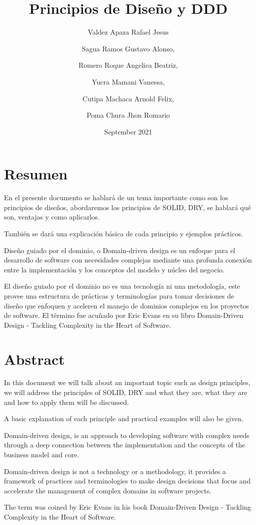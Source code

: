 \documentclass{article}
\title{Principios de Diseño y DDD}
\author{
Valdez Apaza Rafael Jesus 
\and 
Sagua Ramos Gustavo Alonso,
\and 
Romero Roque Angelica Beatriz,
\and 
Yucra Mamani Vanessa,
\and 
Cutipa Machaca Arnold Felix,
\and 
Poma Chura Jhon Romario	

}
\date{September 2021}
\begin{document}
\maketitle

\section{Resumen}

En el presente documento se hablará de un tema importante como son los principios de diseños, abordaremos los principios de SOLID, DRY, se hablará qué son, ventajas y como aplicarlos. 

También se dará una explicación básica de cada principio y ejemplos prácticos. 

Diseño guiado por el dominio, o Domain-driven design es un enfoque para el desarrollo de software con necesidades complejas mediante una profunda conexión entre la implementación y los conceptos del modelo y núcleo del negocio. 

El diseño guiado por el dominio no es una tecnología ni una metodología, este provee una estructura de prácticas y terminologías para tomar decisiones de diseño que enfoquen y aceleren el manejo de dominios complejos en los proyectos de software. 
El término fue acuñado por Eric Evans en su libro Domain-Driven Design - Tackling Complexity in the Heart of Software. 

\section{Abstract}

In this document we will talk about an important topic such as design principles, we will address the principles of SOLID, DRY and what they are, what they are and how to apply them will be discussed. 

A basic explanation of each principle and practical examples will also be given. 

Domain-driven design, is an approach to developing software with complex needs through a deep connection between the implementation and the concepts of the business model and core. 

Domain-driven design is not a technology or a methodology, it provides a framework of practices and terminologies to make design decisions that focus and accelerate the management of complex domains in software projects. 

The term was coined by Eric Evans in his book Domain-Driven Design - Tackling Complexity in the Heart of Software. 
\end{document}
